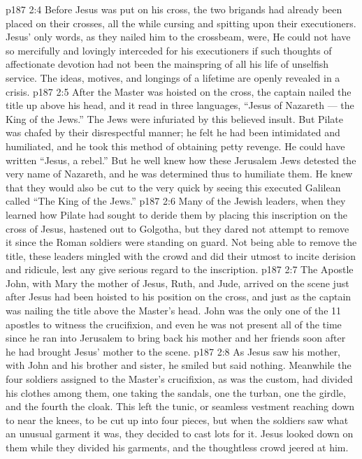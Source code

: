\vs p187 2:4 Before Jesus was put on his cross, the two brigands had already been placed on their crosses, all the while cursing and spitting upon their executioners. Jesus’ only words, as they nailed him to the crossbeam, were,  He could not have so mercifully and lovingly interceded for his executioners if such thoughts of affectionate devotion had not been the mainspring of all his life of unselfish service. The ideas, motives, and longings of a lifetime are openly revealed in a crisis.
\vs p187 2:5 After the Master was hoisted on the cross, the captain nailed the title up above his head, and it read in three languages, “Jesus of Nazareth --- the King of the Jews.” The Jews were infuriated by this believed insult. But Pilate was chafed by their disrespectful manner; he felt he had been intimidated and humiliated, and he took this method of obtaining petty revenge. He could have written “Jesus, a rebel.” But he well knew how these Jerusalem Jews detested the very name of Nazareth, and he was determined thus to humiliate them. He knew that they would also be cut to the very quick by seeing this executed Galilean called “The King of the Jews.”
\vs p187 2:6 Many of the Jewish leaders, when they learned how Pilate had sought to deride them by placing this inscription on the cross of Jesus, hastened out to Golgotha, but they dared not attempt to remove it since the Roman soldiers were standing on guard. Not being able to remove the title, these leaders mingled with the crowd and did their utmost to incite derision and ridicule, lest any give serious regard to the inscription.
\vs p187 2:7 The Apostle John, with Mary the mother of Jesus, Ruth, and Jude, arrived on the scene just after Jesus had been hoisted to his position on the cross, and just as the captain was nailing the title above the Master’s head. John was the only one of the 11 apostles to witness the crucifixion, and even he was not present all of the time since he ran into Jerusalem to bring back his mother and her friends soon after he had brought Jesus’ mother to the scene.
\vs p187 2:8 As Jesus saw his mother, with John and his brother and sister, he smiled but said nothing. Meanwhile the four soldiers assigned to the Master’s crucifixion, as was the custom, had divided his clothes among them, one taking the sandals, one the turban, one the girdle, and the fourth the cloak. This left the tunic, or seamless vestment reaching down to near the knees, to be cut up into four pieces, but when the soldiers saw what an unusual garment it was, they decided to cast lots for it. Jesus looked down on them while they divided his garments, and the thoughtless crowd jeered at him.
